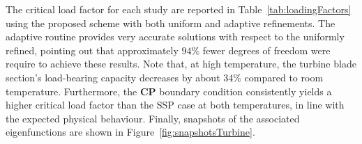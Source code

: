 \documentclass[final,reqno]{elsarticle}
\begin{document}
The critical load factor for each study are reported in Table~\ref{tab:loadingFactors} using the proposed scheme with both uniform and adaptive refinements. The adaptive routine provides very accurate solutions with respect to the uniformly refined, pointing out that approximately $94\%$ fewer degrees of freedom were require to achieve these results. Note that, at high temperature, the turbine blade section’s load-bearing capacity decreases by about $34\%$ compared to room temperature. Furthermore, the \textbf{CP} boundary condition consistently yields a higher critical load factor than the SSP case at both temperatures, in line with the expected physical behaviour. Finally, snapshots of the associated eigenfunctions are shown in Figure~\ref{fig:snapshotsTurbine}.

\begin{table}[!t]
    \setlength{\tabcolsep}{2pt}
    \begin{center}
    \end{center}
    \vspace{-0.5cm}
    \caption{Example 3. Critical load factor for the turbine blade with air-cooling passages (axial holes) at different temperatures under (\textbf{SSP}) and (\textbf{CP}) boundary conditions, using uniform and adaptive refinement.}
    \label{tab:loadingFactors}
\end{table}
\end{document}
